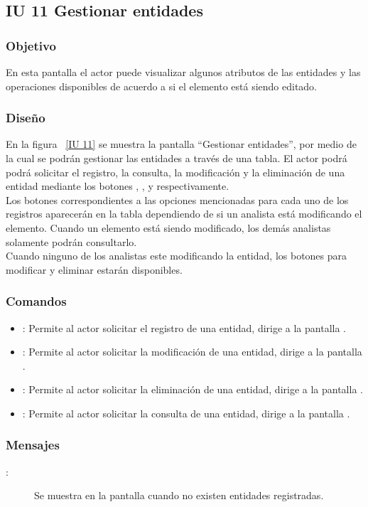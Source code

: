 \newpage 
\subsection{IU 11 Gestionar entidades}
\subsubsection{Objetivo}
	
	En esta pantalla el actor puede visualizar algunos atributos de las entidades y las operaciones disponibles de acuerdo a si el elemento está siendo editado.

\subsubsection{Diseño}

    En la figura ~\ref{IU 11} se muestra la pantalla ``Gestionar entidades'', por medio de la cual 
    se podrán gestionar las entidades a través de una tabla.
    El actor podrá podrá solicitar el registro, la consulta, la modificación y la eliminación de una entidad mediante los botones
    , \btnConsulta, \btnEditar y \btnEliminar respectivamente. \\
    
    Los botones correspondientes a las opciones mencionadas para cada uno de los registros aparecerán en la tabla dependiendo de si 
    un analista está modificando el elemento. Cuando un elemento está siendo modificado, los demás analistas solamente podrán consultarlo.\\
   
    Cuando ninguno de los analistas este modificando la entidad, los botones para modificar y eliminar estarán disponibles.
    


\subsubsection{Comandos}
\begin{itemize}
	\item {}: Permite al actor solicitar el registro de una entidad, dirige a la pantalla .
	\item \btnEditar[Modificar]: Permite al actor solicitar la modificación de una entidad, dirige a la pantalla .
	\item \btnEliminar[Eliminar]: Permite al actor solicitar la eliminación de una entidad, dirige a la pantalla .
	\item \btnConsulta[Consultar]: Permite al actor solicitar la consulta de una entidad, dirige a la pantalla .
\end{itemize}

\subsubsection{Mensajes}

	
\begin{description}
	\item[:] Se muestra en la pantalla  cuando no existen entidades registradas.
\end{description}
